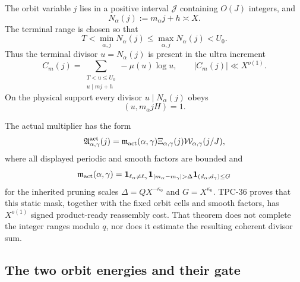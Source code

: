 The orbit variable $j$ lies in a positive interval
$\mathcal J$ containing $O(J)$ integers, and
\begin{equation}
 N_\alpha(j):=m_\alpha j+h\asymp X.
 \label{eq:tpc37-interface-target}
\end{equation}
The terminal range is chosen so that
\begin{equation}
 T<\min_{\alpha,j}N_\alpha(j)
 \le\max_{\alpha,j}N_\alpha(j)<U_0.
 \label{eq:tpc37-interface-terminal-range}
\end{equation}
Thus the terminal divisor $u=N_\alpha(j)$ is present in the ultra
increment
\begin{equation}
 C_m(j)=
 \sum_{\substack{T<u\le U_0\\u\mid mj+h}}
 -\mu(u)\log u,
 \qquad |C_m(j)|\ll X^{o(1)}.
 \label{eq:tpc37-interface-ultra-increment}
\end{equation}
On the physical support every divisor $u\mid N_\alpha(j)$ obeys
\begin{equation}
 (u,m_\alpha jH)=1.
 \label{eq:tpc37-interface-primitivity}
\end{equation}

The actual multiplier has the form
\begin{equation}
 \mathfrak A_{\alpha,\gamma}^{\rm act}(j)
 =\mathfrak m_{\rm act}(\alpha,\gamma)
  \Xi_{\alpha,\gamma}(j)
  \mathcal W_{\alpha,\gamma}(j/J),
 \label{eq:tpc37-interface-multiplier}
\end{equation}
where all displayed periodic and smooth factors are bounded and
\begin{equation}
 \mathfrak m_{\rm act}(\alpha,\gamma)
 =\mathbf1_{\ell_\alpha\ne\ell_\gamma}
  \mathbf1_{|m_\alpha-m_\gamma|>\Delta}
  \mathbf1_{(d_\alpha,d_\gamma)\le G}
 \label{eq:tpc37-interface-static-mask}
\end{equation}
for the inherited pruning scales
$\Delta=QX^{-\kappa_0}$ and $G=X^{\kappa_0}$.
TPC-36 proves that this static mask, together with the fixed orbit cells
and smooth factors, has $X^{o(1)}$ signed product-ready reassembly cost.
That theorem does not complete the integer ranges modulo $q$, nor does
it estimate the resulting coherent divisor sum.

\subsection{The two orbit energies and their gate}


